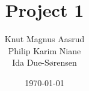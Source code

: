 \documentclass{article}
\title{Project 1}
\author{Knut Magnus Aasrud \\ Philip Karim Niane \\ Ida Due-Sørensen}
\date{\today}
\begin{document}
\maketitle















\printbibliography
\clearpage
\appendix
\iffalse
Appendix should start on own page and have its own section numbering
\fi




%
\end{document}
